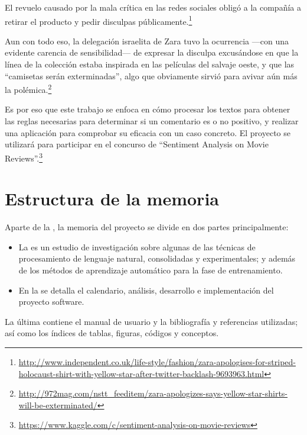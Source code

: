 \begin{example}
El revuelo causado por la mala crítica en las redes sociales obligó a la compañía a retirar el producto y pedir disculpas públicamente.\footnote{\url{http://www.independent.co.uk/life-style/fashion/zara-apologises-for-striped-holocaust-shirt-with-yellow-star-after-twitter-backlash-9693963.html}}

Aun con todo eso, la delegación israelita de Zara tuvo la ocurrencia ---con una evidente carencia de sensibilidad--- de expresar la disculpa excusándose en que la línea de la colección estaba inspirada en las películas del salvaje oeste, y que las ``camisetas serán exterminadas'', algo que obviamente sirvió para avivar aún más la polémica.\footnote{\url{http://972mag.com/nstt_feeditem/zara-apologizes-says-yellow-star-shirts-will-be-exterminated/}}
\end{example}

Es por eso que este trabajo se enfoca en cómo procesar los textos para obtener las reglas necesarias para determinar si un comentario es o no positivo, y realizar una aplicación para comprobar su eficacia con un caso concreto. El proyecto se utilizará para participar en el concurso de  ``Sentiment Analysis on Movie Reviews''.\footnote{\url{https://www.kaggle.com/c/sentiment-analysis-on-movie-reviews}}

\section{Estructura de la memoria}

Aparte de la , la memoria del proyecto se divide en dos partes principalmente:
\begin{itemize}
\item La  es un estudio de investigación sobre algunas de las técnicas de procesamiento de lenguaje natural, consolidadas y experimentales; y además de los métodos de aprendizaje automático para la fase de entrenamiento.
\item En la  se detalla el calendario, análisis, desarrollo e implementación del proyecto software.
\end{itemize}

La última  contiene el manual de usuario y la bibliografía y referencias utilizadas; así como los índices de tablas, figuras, códigos y conceptos.
